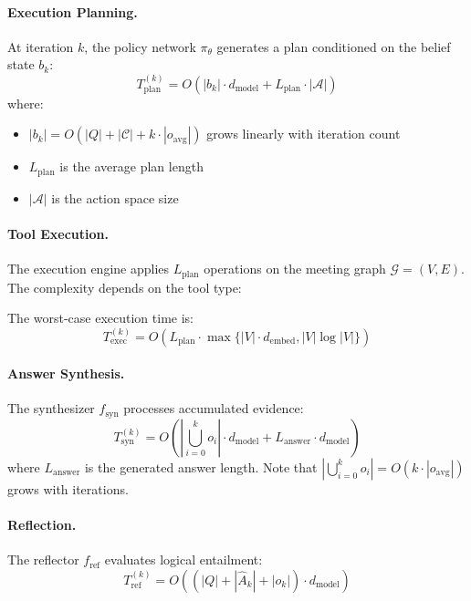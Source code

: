 \documentclass[11pt]{article}
\begin{document}
\paragraph{Execution Planning.}
At iteration $k$, the policy network $\pi_\theta$ generates a plan conditioned on the belief state $b_k$:
\begin{equation}
T_{\text{plan}}^{(k)} = O(|b_k| \cdot d_{\text{model}} + L_{\text{plan}} \cdot |\mathcal{A}|)
\end{equation}
where:
\begin{itemize}
    \item $|b_k| = O(|Q| + |\mathcal{C}| + k \cdot |o_{\text{avg}}|)$ grows linearly with iteration count
    \item $L_{\text{plan}}$ is the average plan length
    \item $|\mathcal{A}|$ is the action space size
\end{itemize}

\paragraph{Tool Execution.}
The execution engine applies $L_{\text{plan}}$ operations on the meeting graph $\mathcal{G} = (V, E)$. The complexity depends on the tool type:



The worst-case execution time is:
\begin{equation}
T_{\text{exec}}^{(k)} = O(L_{\text{plan}} \cdot \max\{|V| \cdot d_{\text{embed}}, |V| \log |V|\})
\end{equation}

\paragraph{Answer Synthesis.}
The synthesizer $f_{\text{syn}}$ processes accumulated evidence:
\begin{equation}
T_{\text{syn}}^{(k)} = O\left(\left|\bigcup_{i=0}^{k} o_i\right| \cdot d_{\text{model}} + L_{\text{answer}} \cdot d_{\text{model}}\right)
\end{equation}
where $L_{\text{answer}}$ is the generated answer length. Note that $\left|\bigcup_{i=0}^{k} o_i\right| = O(k \cdot |o_{\text{avg}}|)$ grows with iterations.

\paragraph{Reflection.}
The reflector $f_{\text{ref}}$ evaluates logical entailment:
\begin{equation}
T_{\text{ref}}^{(k)} = O\left((|Q| + |\hat{A}_k| + |o_k|) \cdot d_{\text{model}}\right)
\end{equation}
\end{document}
